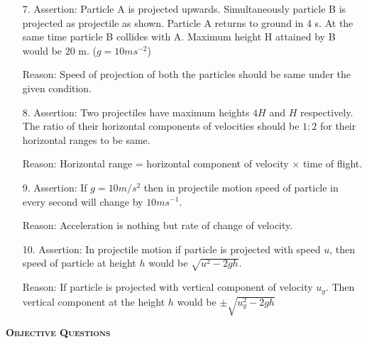 \documentclass{article}
\begin{document}
\begin{enumerate}[leftmargin=2cm]
    \item[7. Assertion:] Particle A is projected upwards. Simultaneously particle B is projected as projectile as shown. Particle A returns to ground in 4 s. At the same time particle B collides with A. Maximum height H attained by B would be 20 m. (\( g = 10 m s^{-2} \))
    \item[Reason:] Speed of projection of both the particles should be same under the given condition.
    
    \item[8. Assertion:] Two projectiles have maximum heights \( 4H \) and \( H \) respectively. The ratio of their horizontal components of velocities should be \( 1:2 \) for their horizontal ranges to be same.
    \item[Reason:] Horizontal range = horizontal component of velocity \( \times \) time of flight.
    
    \item[9. Assertion:] If \( g = 10 m/s^2 \) then in projectile motion speed of particle in every second will change by \( 10 ms^{-1} \).
    \item[Reason:] Acceleration is nothing but rate of change of velocity.
    
    \item[10. Assertion:] In projectile motion if particle is projected with speed \( u \), then speed of particle at height \( h \) would be \( \sqrt{u^2 - 2gh} \).
    \item[Reason:] If particle is projected with vertical component of velocity \( u_y \). Then vertical component at the height \( h \) would be \( \pm \sqrt{u_y^2 - 2gh} \)
\end{enumerate}

\begin{center}
    \textsc{\textbf{Objective Questions}}
\end{center}
\end{document}
